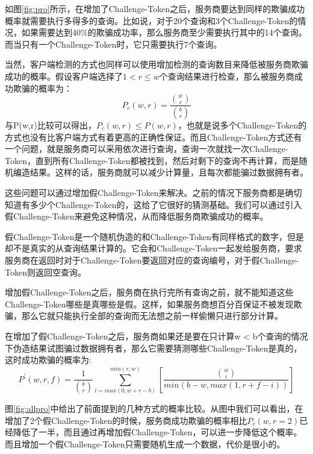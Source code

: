 如图\ref{fig:pro}所示，在增加了Challenge-Token之后，服务商要达到同样的欺骗成功概率就需要执行多得多的查询。比如说，对于20个查询和3个Challenge-Token的情况，如果需要达到40\%的欺骗成功率，那么服务商至少需要执行其中的14个查询。而当只有一个Challenge-Token时，它只需要执行7个查询。

当然，客户端检测的方式也同样可以使用增加检测的查询数目来降低被服务商欺骗成功的概率。假设客户端选择了$1 < r \le w$个查询结果进行检查，那么被服务商成功欺骗的概率为：
\begin{equation} P_c(w,r) = \frac{\binom{w}{r}}{\binom{b}{r}} \end{equation}
与P(w,r)比较可以得出，$P_c(w,r) \le P(w,r)$，也就是说多个Challenge-Token的方式也没有比客户端方式有着更高的正确性保证。而且Challenge-Token方式还有一个问题，就是服务商可以采用依次进行查询，查询一次就找一次Challenge-Token，直到所有Challenge-Token都被找到，然后对剩下的查询不再计算，而是随机编造结果。这样的话，服务商就可以减少计算量，且每次都能骗过数据拥有者。

这些问题可以通过增加假Challenge-Token来解决。之前的情况下服务商都是确切知道有多少个Challenge-Token的，这给了它很好的猜测基础。我们可以通过引入假Challenge-Token来避免这种情况，从而降低服务商欺骗成功的概率。

假Challenge-Token是一个随机伪造的和Challenge-Token有同样格式的数字，但是却不是真实的从查询结果计算的。它会和Challenge-Token一起发给服务商，要求服务商在返回时对于Challenge-Token要返回对应的查询编号，对于假Challenge-Token则返回空查询。

增加假Challenge-Token之后，服务商在执行完所有查询之前，就不能知道这些Challenge-Token哪些是真哪些是假。这样，如果服务商想百分百保证不被发现欺骗，那么它就只能执行全部的查询而无法想之前一样偷懒只进行部分计算。

在增加了假Challenge-Token之后，服务商如果还是要在只计算w < b个查询的情况下伪造结果试图骗过数据拥有者，那么它需要猜测哪些Challenge-Token是真的，这时成功欺骗的概率为:
\begin{equation}P^\prime(w,r,f) = \frac{1}{\binom{b}{r}}\sum_{i=max(0,w+r-b)}^{min(r,w)}[\frac{\binom{w}{i}}{min(b-w,max(1,r+f-i))}]\end{equation}


图\ref{fig:allpro}中给出了前面提到的几种方式的概率比较。从图中我们可以看出，在增加了2个假Challenge-Token的时候，服务商成功欺骗的概率相比$P_c(w,r=2)$已经降低了一半，而且通过再增加假Challenge-Token，可以进一步降低这个概率。而且增加一个假Challenge-Token只需要随机生成一个数据，代价是很小的。

